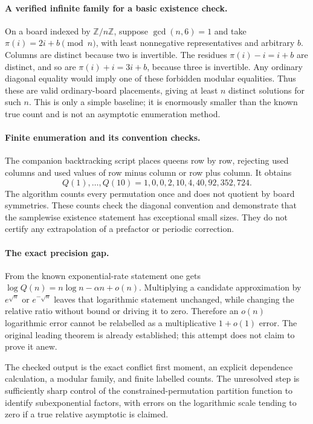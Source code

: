 \documentclass[11pt,a4paper]{article}
\newcommand{\Z}{\mathbb{Z}}
\begin{document}
\paragraph{A verified infinite family for a basic existence check.}
On a board indexed by $\Z/n\Z$, suppose $\gcd(n,6)=1$ and take $\pi(i)=2i+b\pmod n$, with least nonnegative representatives and arbitrary $b$. Columns are distinct because two is invertible. The residues $\pi(i)-i=i+b$ are distinct, and so are $\pi(i)+i=3i+b$, because three is invertible. Any ordinary diagonal equality would imply one of these forbidden modular equalities. Thus these are valid ordinary-board placements, giving at least $n$ distinct solutions for such $n$. This is only a simple baseline; it is enormously smaller than the known true count and is not an asymptotic enumeration method.

\paragraph{Finite enumeration and its convention checks.}
The companion backtracking script places queens row by row, rejecting used columns and used values of row minus column or row plus column. It obtains
\[
 Q(1),\ldots,Q(10)=1,0,0,2,10,4,40,92,352,724.
\]
The algorithm counts every permutation once and does not quotient by board symmetries. These counts check the diagonal convention and demonstrate that the samplewise existence statement has exceptional small sizes. They do not certify any extrapolation of a prefactor or periodic correction.

\paragraph{The exact precision gap.}
From the known exponential-rate statement one gets $\log Q(n)=n\log n-\alpha n+o(n)$. Multiplying a candidate approximation by $e^{\sqrt n}$ or $e^{-\sqrt n}$ leaves that logarithmic statement unchanged, while changing the relative ratio without bound or driving it to zero. Therefore an $o(n)$ logarithmic error cannot be relabelled as a multiplicative $1+o(1)$ error. The original leading theorem is already established; this attempt does not claim to prove it anew.

The checked output is the exact conflict first moment, an explicit dependence calculation, a modular family, and finite labelled counts. The unresolved step is sufficiently sharp control of the constrained-permutation partition function to identify subexponential factors, with errors on the logarithmic scale tending to zero if a true relative asymptotic is claimed.
\end{document}
